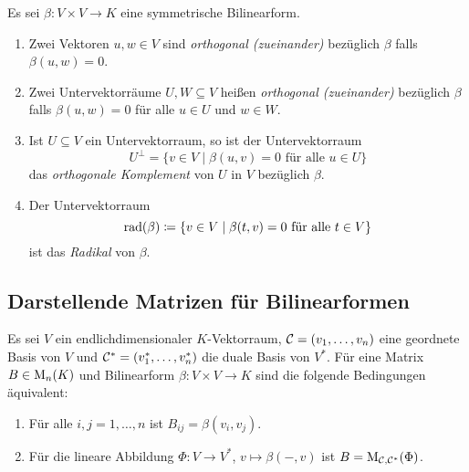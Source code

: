 \begin{definition}
  Es sei $\beta \colon V \times V \to K$ eine symmetrische Bilinearform.
  \begin{enumerate}[leftmargin=*, label=\roman*)]
    \item
      Zwei Vektoren $u, w \in V$ sind \emph{orthogonal (zueinander)} bezüglich $\beta$ falls $\beta(u,w) = 0$.
    \item
      Zwei Untervektorräume $U, W \subseteq V$ heißen \emph{orthogonal (zueinander)} bezüglich $\beta$ falls $\beta(u,w) = 0$ für alle $u \in U$ und $w \in W$.
    \item
      Ist $U \subseteq V$ ein Untervektorraum, so ist der Untervektorraum
      \[
        U^\perp
        =
        \{
          v \in V
          \mid
          \text{$\beta(u,v) = 0$ für alle $u \in U$}
        \}
      \]
      das \emph{orthogonale Komplement} von $U$ in $V$ bezüglich $\beta$.
    \item
      Der Untervektorraum
      \[
        \operatorname{rad}(\beta)
        \coloneqq
        \{v \in V \mid \text{$\beta(t,v) = 0$ für alle $t \in V$}\}
      \]
      ist das \emph{Radikal} von $\beta$.
  \end{enumerate}
\end{definition}












\subsection{Darstellende Matrizen für Bilinearformen}


\begin{lemma}
  Es sei $V$ ein endlichdimensionaler $K$-Vektorraum, $\mathcal{C} = (v_1, \dotsc, v_n)$ eine geordnete Basis von $V$ und $\mathcal{C}^* = (v_1^*, \dotsc, v_n^*)$ die duale Basis von $V^*$.
  Für eine Matrix $B \in \mathrm{M}_n(K)$ und Bilinearform $\beta \colon V \times V \to K$ sind die folgende Bedingungen äquivalent:
  \begin{enumerate}[leftmargin=*, label=\roman*)]
    \item
      Für alle $i,j = 1, \dotsc, n$ ist $B_{ij} = \beta(v_i, v_j)$.
    \item
      Für die lineare Abbildung $\Phi \colon V \to V^*$, $v \mapsto \beta(-,v)$ ist $B = \mathrm{M}_{\mathcal{C}, \mathcal{C}^*}(\Phi)$.
  \end{enumerate}
\end{lemma}


